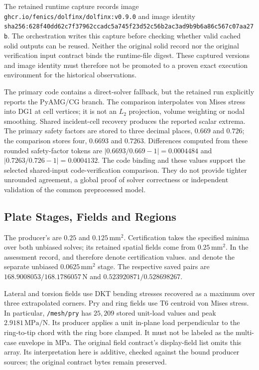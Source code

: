 The retained runtime capture records image \nolinkurl{ghcr.io/fenics/dolfinx/dolfinx:v0.9.0} and image identity \nolinkurl{sha256:628f40dd62c7f37962ccadc5a745f23d52c56b2ac3ad9b9b6a86c567c07aa27b}. The orchestration writes this capture before checking whether valid cached solid outputs can be reused. Neither the original solid record nor the original verification input contract binds the runtime-file digest. These captured versions and image identity must therefore not be promoted to a proven exact execution environment for the historical observations.

The primary code contains a direct-solver fallback, but the retained run explicitly reports the PyAMG/CG branch. The comparison interpolates von Mises stress into DG1 at cell vertices; it is not an $L_2$ projection, volume weighting or nodal smoothing. Shared incident-cell recovery produces the reported scalar extrema. The primary safety factors are stored to three decimal places, $0.669$ and $0.726$; the comparison stores four, $0.6693$ and $0.7263$. Differences computed from these rounded safety-factor tokens are $|0.6693/0.669-1|=0.0004484$ and $|0.7263/0.726-1|=0.0004132$. The code binding and these values support the selected shared-input code-verification comparison. They do not provide tighter unrounded agreement, a global proof of solver correctness or independent validation of the common preprocessed model.

\subsection{Plate Stages, Fields and Regions}
The producer's  are $0.25$ and $0.125\,\mathrm{mm}^2$. Certification takes the specified minima over both unbiased solves; its retained spatial fields come from $0.25\,\mathrm{mm}^2$. In the assessment record,  and  therefore denote certification values.  and  denote the separate unbiased $0.0625\,\mathrm{mm}^2$ stage. The respective saved pairs are $168.9008053/168.1786057\,\mathrm{N}$ and $0.523920871/0.528698267$.

Lateral and torsion fields use DKT bending stresses recovered as a maximum over three extrapolated corners. Pry and ring fields use T6 centroid von Mises stress. In particular, \nolinkurl{/mesh/pry} has $25{,}209$ stored unit-load values and peak $2.9181\,\mathrm{MPa/N}$. Its producer applies a unit in-plane load perpendicular to the ring-to-tip chord with the ring bore clamped. It must not be labeled as the multi-case envelope in MPa. The original field contract's display-field list omits this array. Its interpretation here is additive, checked against the bound producer sources; the original contract bytes remain preserved.

